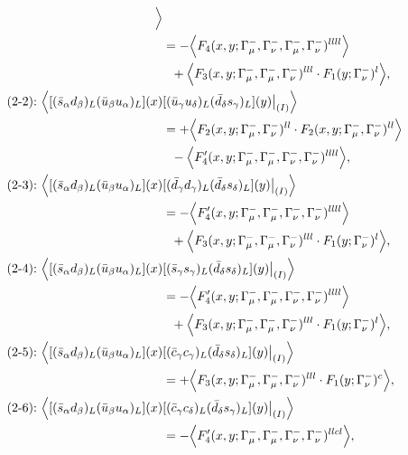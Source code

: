 \begin{align}
\Big\rangle
\notag\\*
&=
 - \Big\langle F_4(x,y;\Gamma_\mu^-,\Gamma_\nu^-,\Gamma_\mu^-,\Gamma_\nu^-)^{llll}\Big\rangle
\notag\\*&\ \ 
 + \Big\langle F_3(x,y;\Gamma_\mu^-,\Gamma_\mu^-,\Gamma_\nu^-)^{lll} \cdot F_1(y;\Gamma_\nu^-)^l\Big\rangle,
\\
\mbox{(2-2):}\ 
\Big\langle
[(\bar s_\alpha d_\beta)_L(\bar u_\beta u_\alpha)_L](x)&
[(\bar u_\gamma u_\delta)_L(\bar d_\delta s_\gamma)_L](y)\big|_{(I)}
\Big\rangle
\notag\\*
&=
 + \Big\langle F_2(x,y;\Gamma_\mu^-,\Gamma_\nu^-)^{ll} \cdot F_2(x,y;\Gamma_\mu^-,\Gamma_\nu^-)^{ll}\Big\rangle
\notag\\*&\ \ 
 - \Big\langle F_4'(x,y;\Gamma_\mu^-,\Gamma_\mu^-,\Gamma_\nu^-,\Gamma_\nu^-)^{llll}\Big\rangle,
\\
\mbox{(2-3):}\ 
\Big\langle
[(\bar s_\alpha d_\beta)_L(\bar u_\beta u_\alpha)_L](x)&
[(\bar d_\gamma d_\gamma)_L(\bar d_\delta s_\delta)_L](y)\big|_{(I)}
\Big\rangle
\notag\\*
&=
 - \Big\langle F_4'(x,y;\Gamma_\mu^-,\Gamma_\mu^-,\Gamma_\nu^-,\Gamma_\nu^-)^{llll}\Big\rangle
\notag\\*&\ \ 
 + \Big\langle F_3(x,y;\Gamma_\mu^-,\Gamma_\mu^-,\Gamma_\nu^-)^{lll} \cdot F_1(y;\Gamma_\nu^-)^l\Big\rangle,
\\
\mbox{(2-4):}\ 
\Big\langle
[(\bar s_\alpha d_\beta)_L(\bar u_\beta u_\alpha)_L](x)&
[(\bar s_\gamma s_\gamma)_L(\bar d_\delta s_\delta)_L](y)\big|_{(I)}
\Big\rangle
\notag\\*
&=
 - \Big\langle F_4'(x,y;\Gamma_\mu^-,\Gamma_\mu^-,\Gamma_\nu^-,\Gamma_\nu^-)^{llll}\Big\rangle
\notag\\*&\ \ 
 + \Big\langle F_3(x,y;\Gamma_\mu^-,\Gamma_\mu^-,\Gamma_\nu^-)^{lll} \cdot F_1(y;\Gamma_\nu^-)^l\Big\rangle,
\\
\mbox{(2-5):}\ 
\Big\langle
[(\bar s_\alpha d_\beta)_L(\bar u_\beta u_\alpha)_L](x)&
[(\bar c_\gamma c_\gamma)_L(\bar d_\delta s_\delta)_L](y)\big|_{(I)}
\Big\rangle
\notag\\*
&=
 + \Big\langle F_3(x,y;\Gamma_\mu^-,\Gamma_\mu^-,\Gamma_\nu^-)^{lll} \cdot F_1(y;\Gamma_\nu^-)^c\Big\rangle,
\\
\mbox{(2-6):}\ 
\Big\langle
[(\bar s_\alpha d_\beta)_L(\bar u_\beta u_\alpha)_L](x)&
[(\bar c_\gamma c_\delta)_L(\bar d_\delta s_\gamma)_L](y)\big|_{(I)}
\Big\rangle
\notag\\*
&=
 - \Big\langle F_4'(x,y;\Gamma_\mu^-,\Gamma_\mu^-,\Gamma_\nu^-,\Gamma_\nu^-)^{llcl}\Big\rangle,

\end{align}
